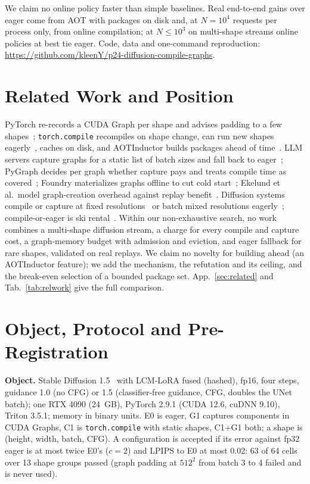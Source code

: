 \documentclass[conference]{IEEEtran}
\newcommand{\tn}[1]{#1}%
\begin{document}
We claim no online policy faster than simple baselines. Real end-to-end gains over eager come from AOT with packages on disk and, at $N{=}10^4$ requests per process only, from online compilation; at $N{\le}10^3$ on multi-shape streams online policies at best tie eager. Code, data and one-command reproduction: \url{https://github.com/kleenY/p24-diffusion-compile-graphs}.

\section{Related Work and Position}\label{m:related}
PyTorch re-records a CUDA Graph per shape and advises padding to a few shapes~\cite{pt_cgtrees}; \texttt{torch.compile} recompiles on shape change, can run new shapes eagerly~\cite{pt_stance}, caches on disk, and AOTInductor builds packages ahead of time~\cite{pt_aoti}. LLM servers capture graphs for a static list of batch sizes and fall back to eager~\cite{vllm_cg,sglang_args}; PyGraph decides per graph whether capture pays and treats compile time as covered~\cite{pygraph}; Foundry materializes graphs offline to cut cold start~\cite{foundry}; Ekelund et al.\ model graph-creation overhead against replay benefit~\cite{ekelund2025}. Diffusion systems compile or capture at fixed resolutions~\cite{stablefast,onediff,fastusp,difflet} or batch mixed resolutions eagerly~\cite{patchedserve}; compile-or-eager is ski rental~\cite{karlin1988}. Within our non-exhaustive search, no work combines a multi-shape diffusion stream, a charge for every compile and capture cost, a graph-memory budget with admission and eviction, and eager fallback for rare shapes, validated on real replays. We claim no novelty for building ahead (an AOTInductor feature); we add the mechanism, the refutation and its ceiling, and the break-even selection of a bounded package set. App.~\ref{sec:related} and Tab.~\ref{tab:relwork} give the full comparison.

\section{Object, Protocol and Pre-Registration}\label{m:method}
\textbf{Object.} Stable Diffusion 1.5~\cite{rombach2022} with LCM-LoRA fused (hashed), fp16, four steps, guidance 1.0 (no CFG) or 1.5 (classifier-free guidance, CFG, doubles the UNet batch); one RTX 4090 (24~GB), PyTorch 2.9.1 (CUDA 12.6, cuDNN 9.10), Triton 3.5.1; memory in binary units. E0 is eager, G1 captures components in CUDA Graphs, C1 is \texttt{torch.compile} with static shapes, C1+G1 both; a shape is (height, width, batch, CFG). A configuration is accepted if its error against fp32 eager is at most twice E0's ($c{=}2$) and LPIPS to E0 at most 0.02: \tn{63} of 64 cells over 13 shape groups passed (graph padding at $512^2$ from batch 3 to 4 failed and is never used).
\end{document}
